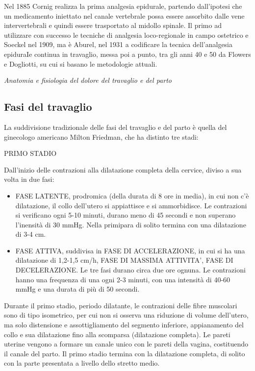 \documentclass[]{article}
\begin{document}
Nel 1885 Cornig realizza la prima analgesia epidurale, partendo
dall'ipotesi che un medicamento iniettato nel canale vertebrale possa
essere assorbito dalle vene intervertebrali e quindi essere trasportato
al midollo spinale. Il primo ad utilizzare con successo le tecniche di
analgesia loco-regionale in campo ostetrico e Soeckel nel 1909, ma è
Aburel, nel 1931 a codificare la tecnica dell'analgesia epiduraIe
continua in travaglio, messa poi a punto, tra gli anni 40 e 50 da
Flowers e Dogliotti, su cui si basano le metodologie attuali.

\emph{Anatomia e fisiologia del dolore del travaglio e del parto}

\hypertarget{fasi-del-travaglio}{%
\subsection{Fasi del travaglio}\label{fasi-del-travaglio}}

La suddivisione tradizionale delle fasi del travaglio e del parto è
quella del ginecologo americano Milton Friedman, che ha distinto tre
stadi:

PRIMO STADIO

Dall'inizio delle contrazioni alla dilatazione completa della cervice,
diviso a sua volta in due fasi:

\begin{itemize}
\item
  FASE LATENTE, prodromica (della durata di 8 ore in media), in cui non
  c'è dilatazione, il collo dell'utero si appiattisce e si ammorbidisce.
  Le contrazioni si verificano ogni 5-10 minuti, durano meno di 45
  secondi e non superano l'inensità di 30 mmHg. Nella primipara di
  solito termina con una dilatazione di 3-4 cm.
\item
  FASE ATTIVA, suddivisa in FASE DI ACCELERAZIONE, in cui si ha una
  dilatazione di 1,2-1,5 cm/h, FASE DI MASSIMA ATTIVITA', FASE DI
  DECELERAZIONE. Le tre fasi durano circa due ore ognuna. Le contrazioni
  hanno una frequenza di una ogni 2-3 minuti, con una intensità di 40-60
  mmHg e una durata di più di 50 secondi.
\end{itemize}

Durante il primo stadio, periodo dilatante, le contrazioni delle fibre
muscolari sono di tipo isometrico, per cui non si osserva una riduzione
di volume dell'utero, ma solo distensione e assottigliamento del
segmento inferiore, appianamento del collo e sua dilatazione fino alla
scomparsa (dilatazione completa). Le pareti uterine vengono a formare un
canale unico con le pareti della vagina, costituendo il canale del
parto. Il primo stadio termina con la dilatazione completa, di solito
con la parte presentata a livello dello stretto medio.
\end{document}
